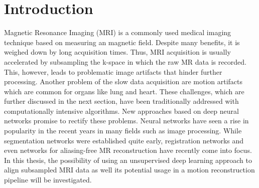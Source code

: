 
\chapter{Introduction} \label{Ch:Introduction}
Magnetic Resonance Imaging (MRI) is a commonly used medical imaging technique based on measuring an magnetic field. 
Despite many benefits, it is weighed down by long acquisition times.
Thus, MRI acquisition is usually accelerated by subsampling the k-space in which the raw MR data is recorded. This, however, leads to problematic image artifacts that hinder further processing. Another problem of the slow data acquisition are motion artifacts which are common for organs like lung and heart. 
These challenges, which are further discussed in the next section, have been traditionally addressed with computationally intensive algorithms.
New approaches based on deep neural networks promise to rectify these problems. Neural networks have seen a rise in popularity in the recent years in many fields such as image processing. While segmentation networks were established quite early, registration networks and even networks for aliasing-free MR reconstruction have recently come into focus.%
In this thesis, the possibility of using an unsupervised deep learning approach to align subsampled MRI data as well its potential usage in a motion reconstruction pipeline will be investigated.

